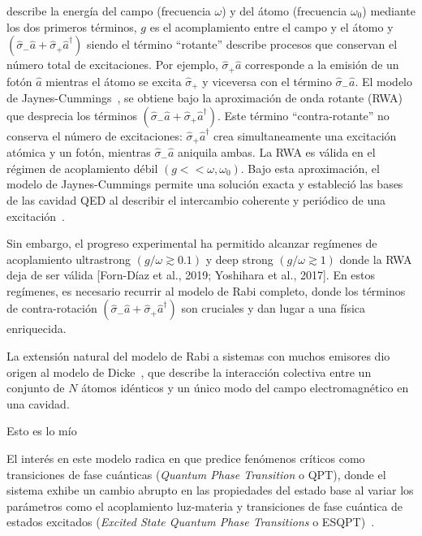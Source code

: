 \documentclass[onecolumn,notitlepage,letterpaper,aps,pra,12pt]{article}
\numberwithin{equation}{section}
\newcommand{\ricardo}[1]{{\color{red}#1}}
\begin{document}
describe la energía del campo (frecuencia $\omega$) y del átomo (frecuencia $\omega_{0}$) mediante los dos primeros términos, $g$ es el acomplamiento entre el campo y el átomo y $(\hat{\sigma}_{-}\hat{a} + \hat{\sigma}_{+}\hat{a}^{\dagger})$ siendo el término ``rotante'' describe procesos que conservan el número total de excitaciones. Por ejemplo, $\hat{\sigma}_{+}\hat{a}$ corresponde a la emisión de un fotón $\hat{a}$ mientras el átomo se excita $\hat{\sigma}_{+}$ y viceversa con el término $\hat{\sigma}_{-}\hat{a}$. El modelo de Jaynes-Cummings~\cite{Jaynes1963}, se obtiene bajo la aproximación de onda rotante (RWA) que desprecia los términos $(\hat{\sigma}_{-}\hat{a} + \hat{\sigma}_{+}\hat{a}^{\dagger})$. Este término  ``contra-rotante'' no conserva el número de excitaciones: $\hat{\sigma}_{+}\hat{a}^{\dagger}$ crea simultaneamente una excitación atómica y un fotón, mientras $\hat{\sigma}_{-}\hat{a}$ aniquila ambas. La RWA es válida en el régimen de acoplamiento débil $(g<<\omega,\omega_{0})$. Bajo esta aproximación, el modelo de Jaynes-Cummings permite una solución exacta y estableció las bases de las cavidad QED al describir el intercambio coherente y periódico de una excitación~\cite{wallraff2004,Schoelkopf2008,devoret2013}.

Sin embargo, el progreso experimental ha permitido alcanzar regímenes de acoplamiento ultrastrong $(g/\omega \gtrsim 0.1)$ y deep strong $(g/\omega \gtrsim 1)$ donde la RWA deja de ser válida [Forn-Díaz et al., 2019; Yoshihara et al., 2017]. En estos regímenes, es necesario recurrir al modelo de Rabi completo, donde los términos de contra-rotación $(\hat{\sigma}_{-}\hat{a} + \hat{\sigma}_{+}\hat{a}^{\dagger})$ son cruciales y dan lugar a una física enriquecida.

La extensión natural del modelo de Rabi a sistemas con muchos emisores dio origen al modelo de Dicke~\cite{Dicke54}, que describe la interacción colectiva entre un conjunto de $N$ átomos idénticos y un único modo del campo electromagnético en una cavidad. 

\ricardo{Esto es lo mío}

El interés en este modelo  radica en que predice fenómenos críticos como transiciones de fase cuánticas (\textit{Quantum Phase Transition} o QPT), donde el sistema exhibe un cambio abrupto en las propiedades del estado base al variar los parámetros como el acoplamiento luz-materia y transiciones de fase cuántica de estados excitados (\textit{Excited State Quantum Phase Transitions} o ESQPT)~\cite{Hepp73,wang1973,hioe1973,Sachdev99,Larson17}. 
\end{document}
